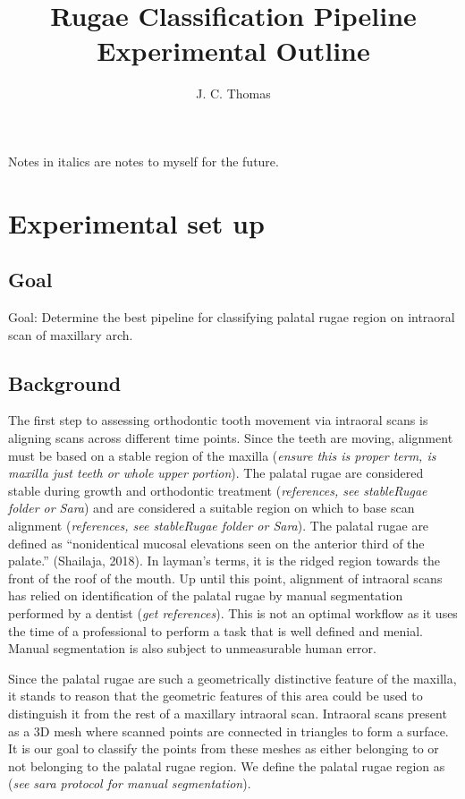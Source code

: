 \documentclass[11pt]{article}
\title{Rugae Classification Pipeline Experimental Outline}
\author{J. C. Thomas}
\theoremstyle{definition}
\begin{document}
\maketitle

Notes in italics are notes to myself for the future.

\section{Experimental set up}

\subsection{Goal}

Goal: Determine the best pipeline for classifying palatal rugae region on intraoral scan of maxillary arch.

\subsection{Background}

The first step to assessing orthodontic tooth movement via intraoral scans is aligning scans across different time points. Since the teeth are moving, alignment must be based on a stable region of the maxilla (\textit{ensure this is proper term, is maxilla just teeth or whole upper portion}). The palatal rugae are considered stable during growth and orthodontic treatment (\textit{references, see stableRugae folder or Sara}) and are considered a suitable region on which to base scan alignment (\textit{references, see stableRugae folder or Sara}). The palatal rugae are defined as “nonidentical mucosal elevations seen on the anterior third of the palate.” (Shailaja, 2018). In layman’s terms, it is the ridged region towards the front of the roof of the mouth. Up until this point, alignment of intraoral scans has relied on identification of the palatal rugae by manual segmentation performed by a dentist (\textit{get references}). This is not an optimal workflow as it uses the time of a professional to perform a task that is well defined and menial. Manual segmentation is also subject to unmeasurable human error. 

Since the palatal rugae are such a geometrically distinctive feature of the maxilla, it stands to reason that the geometric features of this area could be used to distinguish it from the rest of a maxillary intraoral scan. Intraoral scans present as a 3D mesh where scanned points are connected in triangles to form a surface. It is our goal to classify the points from these meshes as either belonging to or not belonging to the palatal rugae region. We define the palatal rugae region as (\textit{see sara protocol for manual segmentation}).
\end{document}
